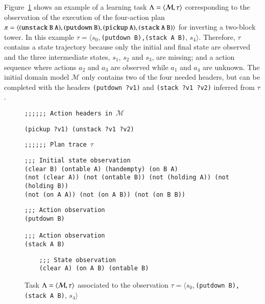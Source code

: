 Figure~\ref{fig:example-plans} shows an example of a learning task $\Lambda={\langle \mathcal{M},\tau \rangle}$ corresponding to the observation of the execution of the four-action plan $\pi={\langle \small\tt (unstack\ B\ A), (putdown\ B), (pickup\ A), (stack\ A\ B) \rangle}$ for inverting a two-block tower. In this example $\tau=\langle s_0,${\small\tt (putdown\ B),(stack\ A\ B)}, $s_4\rangle$. \textcolor[rgb]{1.00,0.00,0.00}{Therefore, $\tau$ contains a \NO state trajectory because only the initial and final state are observed and the three intermediate states, $s_1$, $s_2$ and $s_3$, are missing; and a \PO action sequence where actions $a_2$ and $a_3$ are observed while $a_1$ and $a_4$ are unknown.} The initial domain model $\mathcal{M}$ only contains two of the four needed headers, but can be completed with the headers {\small\tt(putdown ?v1)} and {\small\tt(stack ?v1 ?v2)} inferred from $\tau$.

\begin{figure}[hbt!]
{\footnotesize\tt ;;;;;; Action headers in $\mathcal{M}$}
\begin{footnotesize}
\begin{verbatim}
(pickup ?v1) (unstack ?v1 ?v2)
\end{verbatim}
\end{footnotesize}
\vspace{0.2cm}
{\footnotesize\tt ;;;;;; Plan trace $\tau$}
\begin{footnotesize}
\begin{verbatim}
;;; Initial state observation
(clear B) (ontable A) (handempty) (on B A)
(not (clear A)) (not (ontable B)) (not (holding A)) (not (holding B))
(not (on A A)) (not (on A B)) (not (on B B))
\end{verbatim}
\end{footnotesize}

\begin{footnotesize}
\begin{verbatim}
;;; Action observation
(putdown B)

;;; Action observation
(stack A B)
\end{verbatim}
\end{footnotesize}

\begin{footnotesize}
	\begin{verbatim}
	;;; State observation
	(clear A) (on A B) (ontable B)
	\end{verbatim}
\end{footnotesize}

 \caption{\small Task $\Lambda={\langle \mathcal{M},\tau \rangle}$ associated to the observation $\tau=\langle s_0,${\small\tt (putdown\ B),(stack\ A\ B)}, $s_4\rangle$}
\label{fig:example-plans}
\end{figure}

